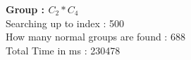 \textbf{Group : $C_2*C_4$}\\
Searching up to index : 500\\
How many normal groups are found : 688\\
Total Time in ms : 230478\\

